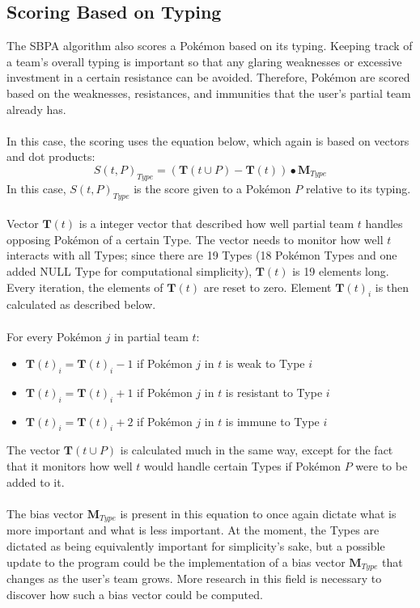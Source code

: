 \documentclass{article}
\begin{document}
\subsection{Scoring Based on Typing}
The SBPA algorithm also scores a Pok\'emon based on its typing. Keeping track of a team's overall typing is important so that any glaring weaknesses or excessive investment in a certain resistance can be avoided. Therefore, Pok\'emon are scored based on the weaknesses, resistances, and immunities that the user's partial team already has.\\\\
In this case, the scoring uses the equation below, which again is based on vectors and dot products:
\begin{equation}\label{TypeScoreEqn}
	S(t,P)_{Type}=(\textbf{T}(t\cup P)-\textbf{T}(t))\bullet\textbf{M}_{Type}
\end{equation}
In this case, $S(t,P)_{Type}$ is the score given to a Pok\'emon $P$ relative to its typing.\\\\
Vector $\textbf{T}(t)$ is a integer vector that described how well partial team $t$ handles opposing Pok\'emon of a certain Type. The vector needs to monitor how well $t$ interacts with all Types; since there are 19 Types (18 Pok\'emon Types and one added NULL Type for computational simplicity), $\textbf{T}(t)$ is 19 elements long. Every iteration, the elements of $\textbf{T}(t)$ are reset to zero. Element $\textbf{T}(t)_i$ is then calculated as described below.\\\\
For every Pok\'emon $j$ in partial team $t$:
\begin{itemize}
	\item $\textbf{T}(t)_i=\textbf{T}(t)_i-1$ if Pok\'emon $j$ in $t$ is weak to Type $i$
	\item $\textbf{T}(t)_i=\textbf{T}(t)_i+1$ if Pok\'emon $j$ in $t$ is resistant to Type $i$
	\item $\textbf{T}(t)_i=\textbf{T}(t)_i+2$ if Pok\'emon $j$ in $t$ is immune to Type $i$
\end{itemize}
The vector $\textbf{T}(t\cup P)$ is calculated much in the same way, except for the fact that it monitors how well $t$ would handle certain Types if Pok\'emon $P$ were to be added to it.\\\\
The bias vector $\textbf{M}_{Type}$ is present in this equation to once again dictate what is more important and what is less important. At the moment, the Types are dictated as being equivalently important for simplicity's sake, but a possible update to the program could be the implementation of a bias vector $\textbf{M}_{Type}$ that changes as the user's team grows. More research in this field is necessary to discover how such a bias vector could be computed.\\\\
\end{document}
